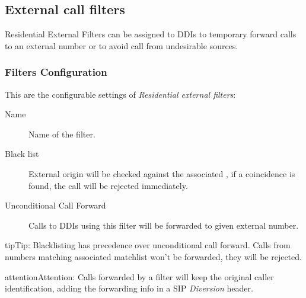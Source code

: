\documentclass[letterpaper,10pt,english]{sphinxmanual}
\begin{document}
\subsection{External call filters}
\label{administration_portal/client/residential/external_call_filters:external-call-filters}\label{administration_portal/client/residential/external_call_filters:residential-filters}\label{administration_portal/client/residential/external_call_filters::doc}
Residential External Filters can be assigned to DDIs to temporary
forward calls to an external number or to avoid call from undesirable sources.


\subsubsection{Filters Configuration}
\label{administration_portal/client/residential/external_call_filters:filters-configuration}
This are the configurable settings of \emph{Residential external filters}:
\begin{description}
\item[{Name}] \leavevmode{}\label{administration_portal/client/residential/external_call_filters:term-name}
Name of the filter.

\item[{Black list}] \leavevmode{}\label{administration_portal/client/residential/external_call_filters:term-black-list}
External origin will be checked against the associated {\hyperref[administration_portal/client/vpbx/routing_tools/match_lists:match\string-lists]{}},
if a coincidence is found, the call will be rejected immediately.

\item[{Unconditional Call Forward}] \leavevmode{}\label{administration_portal/client/residential/external_call_filters:term-unconditional-call-forward}
Calls to DDIs using this filter will be forwarded to given external number.

\end{description}

\begin{notice}{tip}{Tip:}
Blacklisting has precedence over unconditional call forward. Calls from numbers
matching associated matchlist won't be forwarded, they will be rejected.
\end{notice}

\begin{notice}{attention}{Attention:}
Calls forwarded by a filter will keep the original
caller identification, adding the forwarding info in a SIP
\emph{Diversion} header.
\end{notice}
\end{document}
